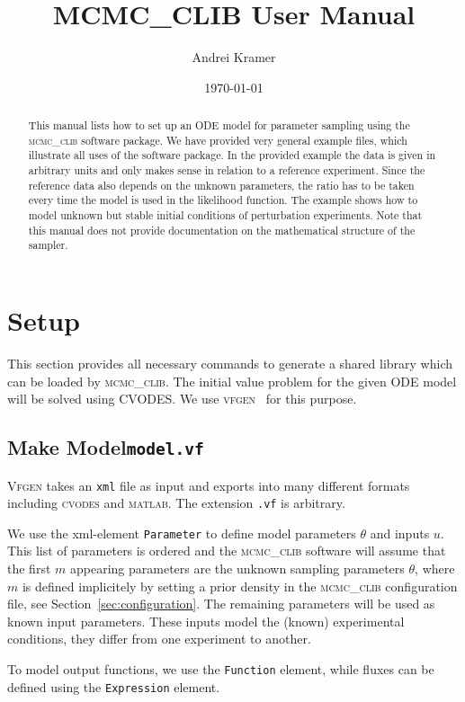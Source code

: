 \documentclass[english,12pt]{scrartcl}
\title{MCMC\_CLIB User Manual}
\author{Andrei Kramer}
\date{\today}
\newcommand{\CLIB}{\textsc{mcmc\_clib}}
\begin{document}
\maketitle
\begin{abstract}
  This manual lists how to set up an ODE model for parameter sampling
  using the \CLIB{} software package. We have provided very general
  example files, which illustrate all uses of the software package. In
  the provided example the data is given in arbitrary units and only
  makes sense in relation to a reference experiment. Since the
  reference data also depends on the unknown parameters, the ratio has
  to be taken every time the model is used in the likelihood
  function. The example shows how to model unknown but stable initial
  conditions of perturbation experiments. Note that this manual does
  not provide documentation on the mathematical structure of the
  sampler. 
\end{abstract}
\tableofcontents
\section{Setup}
\label{sec:setup}

This section provides all necessary commands to generate a shared
library which can be loaded by \CLIB{}. The initial value problem for
the given ODE model will be solved using CVODES. We use
\textsc{vfgen}~\cite{vfgen} for this purpose.

\subsection[make model]{Make Model\hfill\texttt{model.vf}}
\label{sec:model}

\textsc{Vfgen} takes an \texttt{xml} file as input and exports into
many different formats including \textsc{cvodes} and
\textsc{matlab}. The extension \texttt{.vf} is arbitrary.

We use the xml-element \texttt{Parameter} to define model parameters
$\theta$ and inputs $u$. This list of parameters is ordered and the
\CLIB{} software will assume that the first $m$ appearing parameters
are the unknown sampling parameters $\theta$, where $m$ is defined
implicitely by setting a prior density in the \CLIB{} configuration
file, see Section~\vref{sec:configuration}. The remaining parameters
will be used as known input parameters. These inputs model the (known)
experimental conditions, they differ from one experiment to another.

To model output functions, we use the \texttt{Function} element, while
fluxes can be defined using the \texttt{Expression} element.
\end{document}
